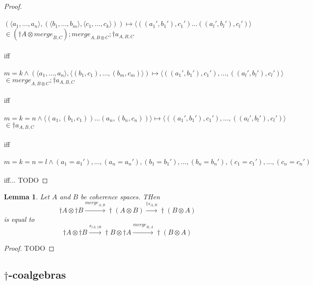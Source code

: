 \documentclass{article}
\newtheorem{lemma}{Lemma}
\begin{document}
\begin{proof}~\\~\\
$(\langle a_1, \ldots, a_n \rangle, (\langle b_1,\ldots,b_m\rangle,\langle c_1,\ldots,c_k\rangle)) 
\mapsto \langle ((a_1',b_1'),c_1') \ldots ((a_l',b_l'),c_l') \rangle$ \\
$\in (\dagger A \otimes \mathit{merge}_{B,C});\mathit{merge}_{A,B \otimes C};\dagger a_{A,B,C}$\\~\\
iff\\~\\
$m=k \wedge (\langle a_1, \ldots, a_n \rangle,\langle (b_1,c_1),\ldots,(b_m,c_m) \rangle) \mapsto
\langle ((a_1',b_1'),c_1'),\ldots,((a_l',b_l'),c_l') \rangle$\\
$\in \mathit{merge}_{A,B \otimes C};\dagger a_{A,B,C}$\\~\\
iff\\~\\
$m=k=n \wedge \langle (a_1,(b_1,c_1)) \ldots (a_n,(b_n,c_n)) \rangle \mapsto \langle ((a_1',b_1'),c_1'),\ldots,((a_l',b_l'),c_l') \rangle$\\
$\in \dagger a_{A,B,C}$\\~\\
iff\\~\\
$m=k=n=l \wedge (a_1 = a_1'),\ldots,(a_n = a_n'),(b_1 = b_1'),\ldots,(b_n = b_n'),(c_1 = c_1'),\ldots,(c_n = c_n')$\\~\\
iff... TODO

\end{proof}

\begin{lemma}
Let $A$ and $B$ be coherence spaces. THen
$$\dagger A \otimes \dagger B \overset{\mathit{merge}_{A,B}}{\longrightarrow} \dagger(A \otimes B) \overset{\dagger s_{A,B}}{\longrightarrow} \dagger (B \otimes A)$$
is equal to 
$$\dagger A \otimes \dagger B \overset{s_{\dagger A,\dagger B}}{\longrightarrow} \dagger B \otimes \dagger A 
\overset{\mathit{merge}_{B,A}}{\longrightarrow} \dagger (B \otimes A)$$
\end{lemma}

\begin{proof}
TODO
\end{proof}

\subsection*{$\dagger$-coalgebras}
\end{document}
